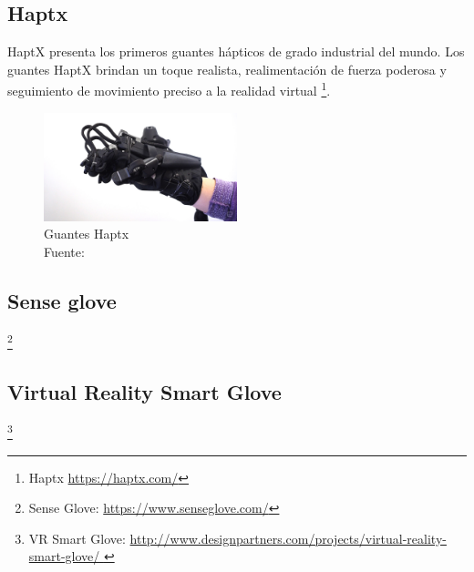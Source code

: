 \subsection{Haptx}
HaptX presenta los primeros guantes hápticos de grado industrial del mundo. Los guantes HaptX brindan un toque realista, realimentación de fuerza poderosa y seguimiento de movimiento preciso a la realidad virtual \footnote{ Haptx \url{https://haptx.com/}}.

\begin{figure}[H]
  \begin{center} 
   	\includegraphics[width=0.5\textwidth]{images/chapter02/haptx01.jpg} 
    \caption[Guantes Haptx]{Guantes Haptx \\Fuente: \cite{haptx-info-page}} 
    \label{fig:haptx}
  \end{center}
\end{figure}

\subsection{Sense glove}
\footnote{Sense Glove: \url{https://www.senseglove.com/}}

\subsection{Virtual Reality Smart Glove}
\footnote{VR Smart Glove: \url{http://www.designpartners.com/projects/virtual-reality-smart-glove/
}}

